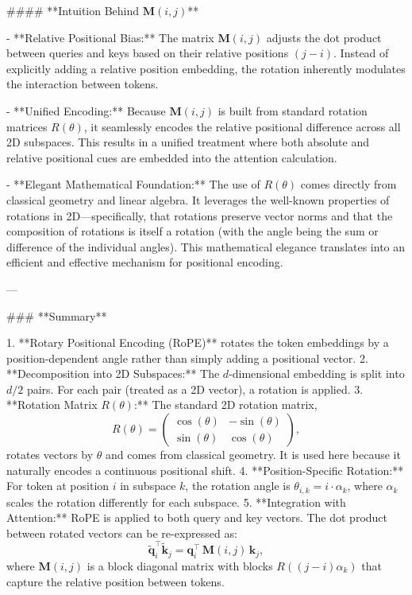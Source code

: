 #### **Intuition Behind \(\mathbf{M}(i,j)\)**

- **Relative Positional Bias:**  
  The matrix \(\mathbf{M}(i,j)\) adjusts the dot product between queries and keys based on their relative positions \((j-i)\). Instead of explicitly adding a relative position embedding, the rotation inherently modulates the interaction between tokens.
  
- **Unified Encoding:**  
  Because \(\mathbf{M}(i,j)\) is built from standard rotation matrices \(R(\theta)\), it seamlessly encodes the relative positional difference across all 2D subspaces. This results in a unified treatment where both absolute and relative positional cues are embedded into the attention calculation.
  
- **Elegant Mathematical Foundation:**  
  The use of \(R(\theta)\) comes directly from classical geometry and linear algebra. It leverages the well-known properties of rotations in 2D—specifically, that rotations preserve vector norms and that the composition of rotations is itself a rotation (with the angle being the sum or difference of the individual angles). This mathematical elegance translates into an efficient and effective mechanism for positional encoding.

---

### **Summary**

1. **Rotary Positional Encoding (RoPE)** rotates the token embeddings by a position-dependent angle rather than simply adding a positional vector.
2. **Decomposition into 2D Subspaces:**  
   The \(d\)-dimensional embedding is split into \(d/2\) pairs. For each pair (treated as a 2D vector), a rotation is applied.
3. **Rotation Matrix \(R(\theta)\):**  
   The standard 2D rotation matrix,
   \[
   R(\theta) = 
   \begin{pmatrix}
   \cos(\theta) & -\sin(\theta) \\
   \sin(\theta) & \cos(\theta)
   \end{pmatrix},
   \]
   rotates vectors by \(\theta\) and comes from classical geometry. It is used here because it naturally encodes a continuous positional shift.
4. **Position-Specific Rotation:**  
   For token at position \(i\) in subspace \(k\), the rotation angle is \(\theta_{i, k} = i \cdot \alpha_k\), where \(\alpha_k\) scales the rotation differently for each subspace.
5. **Integration with Attention:**  
   RoPE is applied to both query and key vectors. The dot product between rotated vectors can be re-expressed as:
   \[
   \tilde{\mathbf{q}}_i^\top \tilde{\mathbf{k}}_j = \mathbf{q}_i^\top\, \mathbf{M}(i,j)\, \mathbf{k}_j,
   \]
   where \(\mathbf{M}(i,j)\) is a block diagonal matrix with blocks \(R((j-i)\alpha_k)\) that capture the relative position between tokens.

